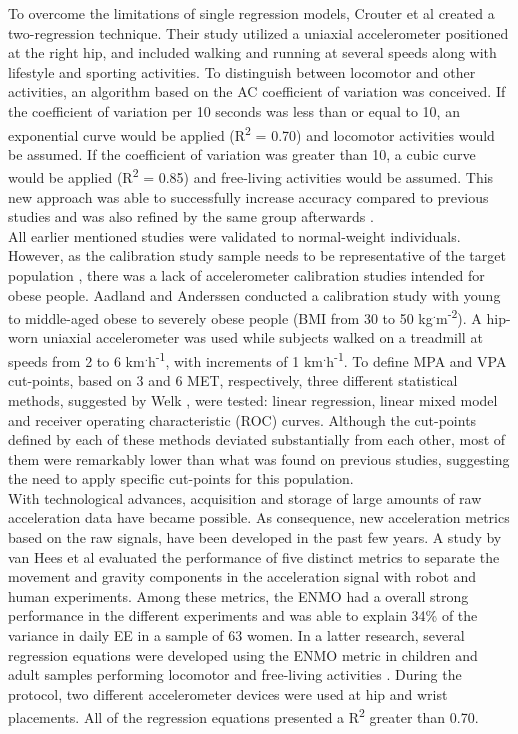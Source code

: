 \documentclass[11pt]{article}
\begin{document}
To overcome the limitations of single regression models, Crouter et al \citeyear{Crouter_2006} created a two-regression technique. Their study utilized a uniaxial accelerometer positioned at the right hip, and included walking and running at several speeds along with lifestyle and sporting activities. To distinguish between locomotor and other activities, an algorithm based on the AC coefficient of variation was conceived. If the coefficient of variation per 10 seconds was less than or equal to 10, an exponential curve would be applied (R\textsuperscript{2} = 0.70) and locomotor activities would be assumed. If the coefficient of variation was greater than 10, a cubic curve would be applied (R\textsuperscript{2} = 0.85) and free-living activities would be assumed. This new approach was able to successfully increase accuracy compared to previous studies and was also refined by the same group afterwards \cite{Crouter_2010}. \\

All earlier mentioned studies were validated to normal-weight individuals. However, as the calibration study sample needs to be representative of the target population \cite{Welk_2005, Strath_2012}, there was a lack of accelerometer calibration studies intended for obese people. Aadland and Anderssen \citeyear{Aadland_2012} conducted a calibration study with young to middle-aged obese to severely obese people (BMI from 30 to 50 kg\textsuperscript{.}m\textsuperscript{-2}). A hip-worn uniaxial accelerometer was used while subjects walked on a treadmill at speeds from 2 to 6 km\textsuperscript{.}h\textsuperscript{-1}, with increments of 1 km\textsuperscript{.}h\textsuperscript{-1}.  To define MPA and VPA cut-points, based on 3 and 6 MET, respectively, three different statistical methods, suggested by Welk \citeyear{Welk_2005}, were tested: linear regression, linear mixed model and receiver operating characteristic (ROC) curves. Although the cut-points defined by each of these methods deviated substantially from each other, most of them were remarkably lower than what was found on previous studies, suggesting the need to apply specific cut-points for this population. \\

With technological advances, acquisition and storage of large amounts of raw acceleration data have became possible. As consequence, new acceleration metrics based on the raw signals, have been developed in the past few years. A study by van Hees et al \citeyear{vanHees_2013} evaluated the performance of five distinct metrics to separate the movement and gravity components in the acceleration signal with robot and human experiments. Among these metrics, the ENMO had a overall strong performance in the different experiments and was able to explain 34\% of the variance in daily EE in a sample of 63 women. In a latter research, several regression equations were developed using the ENMO metric in children and adult samples performing locomotor and free-living activities \cite{Hildebrand_2014}. During the protocol, two different accelerometer devices were used at hip and wrist placements. All of the regression equations presented a R\textsuperscript{2} greater than 0.70. \\
\end{document}

